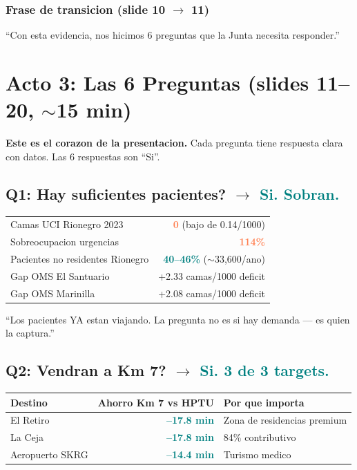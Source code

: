 \documentclass[11pt, a4paper]{article}
\newcommand{\hl}[1]{\textcolor{teal}{\textbf{#1}}}
\newcommand{\dg}[1]{\textcolor{coral}{\textbf{#1}}}
\begin{document}
\subsubsection{Frase de transicion (slide 10 $\to$ 11)}

\begin{cita}
``Con esta evidencia, nos hicimos 6 preguntas que la Junta necesita responder.''
\end{cita}

\section{Acto 3: Las 6 Preguntas (slides 11--20, $\sim$15 min)}

\begin{alerta}
\textbf{Este es el corazon de la presentacion.} Cada pregunta tiene respuesta clara con datos. Las 6 respuestas son ``Si''.
\end{alerta}

\subsection{Q1: Hay suficientes pacientes? $\to$ \hl{Si. Sobran.}}

\begin{tabular}{@{}l r@{}}
\toprule
Camas UCI Rionegro 2023 & \dg{0} (bajo de 0.14/1000) \\
Sobreocupacion urgencias & \dg{114\%} \\
Pacientes no residentes Rionegro & \hl{40--46\%} ($\sim$33,600/ano) \\
Gap OMS El Santuario & +2.33 camas/1000 deficit \\
Gap OMS Marinilla & +2.08 camas/1000 deficit \\
\bottomrule
\end{tabular}

\begin{cita}
``Los pacientes YA estan viajando. La pregunta no es si hay demanda --- es quien la captura.''
\end{cita}

\subsection{Q2: Vendran a Km 7? $\to$ \hl{Si. 3 de 3 targets.}}

\begin{tabular}{@{}l r l@{}}
\toprule
\textbf{Destino} & \textbf{Ahorro Km 7 vs HPTU} & \textbf{Por que importa} \\
\midrule
\rowcolor{bglight}
El Retiro & \hl{--17.8 min} & Zona de residencias premium \\
La Ceja & \hl{--17.8 min} & 84\% contributivo \\
\rowcolor{bglight}
Aeropuerto SKRG & \hl{--14.4 min} & Turismo medico \\
\bottomrule
\end{tabular}
\end{document}
